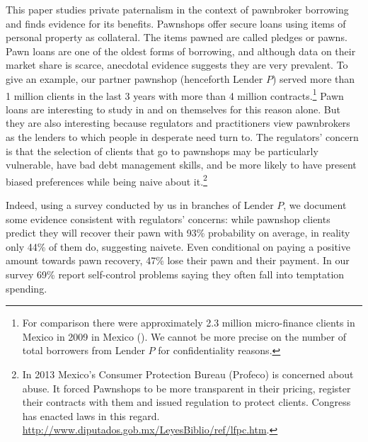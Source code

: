 \documentclass[11pt]{article}
\begin{document}
This paper studies private paternalism in the context of pawnbroker borrowing and finds evidence for its benefits. Pawnshops offer secure loans using items of personal property as collateral. The items pawned are called pledges or pawns. Pawn loans are one of the oldest forms of borrowing, and although data on their market share is scarce, anecdotal evidence suggests they are very prevalent. To give an example, our partner pawnshop (henceforth Lender $P$) served more than 1 million clients in the last 3 years with more than 4 million contracts.\footnote{For comparison there were approximately 2.3 million micro-finance clients in Mexico in 2009 in Mexico (\cite{Pedroza:2010}). We cannot be more precise on the number of total borrowers from Lender $P$ for confidentiality reasons.}  Pawn loans are interesting to study in and on themselves for this reason alone. But they are also interesting because regulators and practitioners view pawnbrokers as the lenders to which people in desperate need turn to. The regulators' concern is that the selection of clients that go to pawnshops may be particularly vulnerable, have bad debt management skills, and be more likely to have present biased preferences while being naive about it.\footnote{In 2013 Mexico's Consumer Protection Bureau (Profeco) is concerned about abuse. It forced Pawnshops to be more transparent in their pricing, register their contracts with them and issued regulation to protect clients. Congress has enacted laws in this regard. \url{http://www.diputados.gob.mx/LeyesBiblio/ref/lfpc.htm}.} 

Indeed, using a survey conducted by us in branches of Lender $P$, we document some evidence consistent with regulators' concerns: while pawnshop clients predict they will recover their pawn with 93\% probability on average, in reality only 44\% of them do, suggesting naivete. Even conditional on paying a positive amount towards pawn recovery, 47\% lose their pawn and their payment. In our survey 69\% report self-control problems saying they often fall into temptation spending. %
\end{document}
